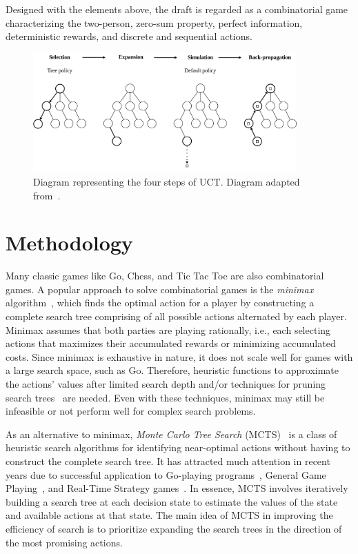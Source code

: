 Designed with the elements above, the draft is regarded as a combinatorial game characterizing the two-person, zero-sum property, perfect information, deterministic rewards, and discrete and sequential actions. 


\begin{figure}
\centering
\includegraphics[width=0.9\textwidth]{Figures/mcts_plot_my2.png}
\caption{Diagram representing the four steps of UCT. Diagram adapted from~\textcite{browne2012survey}.}
\label{fig:mctsplot}
\end{figure}



\section{Methodology}\label{sec:mcts}
Many classic games like Go, Chess, and Tic Tac Toe are also combinatorial games. A popular approach to solve combinatorial games is the \textit{minimax} algorithm~\citep{knuth1975analysis}, which finds the optimal action for a player by constructing a complete search tree comprising of all possible actions alternated by each player. Minimax assumes that both parties are playing rationally, i.e., each selecting actions that maximizes their accumulated rewards or minimizing accumulated costs. Since minimax is exhaustive in nature, it does not scale well for games with a large search space, such as Go. Therefore, heuristic functions to approximate the actions' values after limited search depth and/or techniques for pruning search trees~\citep{knuth1975analysis} are needed. Even with these techniques, minimax may still be infeasible or not perform well for complex search problems. 


As an alternative to minimax, \textit{Monte Carlo Tree Search} (MCTS)~\citep{coulom2006efficient,kocsis2006bandit,nguyen2014bootstrapping} is a class of heuristic search algorithms for identifying near-optimal actions without having to construct the complete search tree. It has attracted much attention in recent years due to successful application to Go-playing programs~\citep{silver2016mastering,silver2017mastering}, General Game Playing~\citep{finnsson2008simulation}, and Real-Time Strategy games~\citep{balla2009uct}. In essence, MCTS involves iteratively building a search tree at each decision state to estimate the values of the state and available actions at that state. The main idea of MCTS in improving the efficiency of search is to prioritize expanding the search trees in the direction of the most promising actions.

